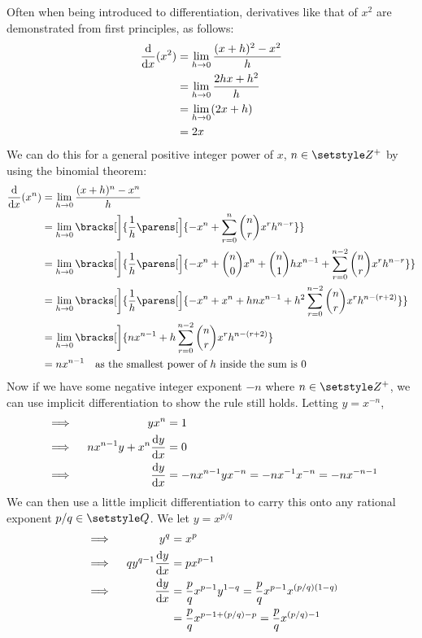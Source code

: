 Often when being introduced to differentiation, derivatives like that of
\(x^2\) are demonstrated from first principles, as follows:
\begin{align*}
    \dv{x}(x^2) &= \lim_{h \to 0} \frac{(x + h)^2 - x^2} h \\
                  &= \lim_{h \to 0} \frac{2hx + h^2} h \\
                  &= \lim_{h \to 0} (2x + h) \\
                  &= 2x
\end{align*}
We can do this for a general positive integer power of \(x\),
\(n \in \Integers^+\) by using the binomial theorem:
\begin{align*}
    \dv{x}(x^n) &= \lim_{h \to 0} \frac{(x + h)^n - x^n} h \\
                  &= \lim_{h \to 0} \bracks[\bigg]{\frac 1h \parens[\Big]{-x^n
                          + \sum_{r = 0}^n \binom nr x^r h^{n - r}}} \\
                  &= \lim_{h \to 0} \bracks[\bigg]{\frac 1h \parens[\Big]{
                          -x^n + \binom n0 x^n + \binom n1 hx^{n - 1}
                          + \sum_{r = 0}^{n - 2}
                  \binom nr x^r h^{n - r}}} \\
              &= \lim_{h \to 0} \bracks[\bigg]{\frac 1h \parens[\Big]{-x^n + x^n
                          + hnx^{n - 1} + h^2 \sum_{r = 0}^{n - 2}
                  \binom nr x^r h^{n - (r + 2)}}} \\
                  &= \lim_{h \to 0} \bracks[\bigg]{nx^{n - 1} + h \sum_{r = 0}^{n - 2}
                  \binom nr x^r h^{n - (r + 2)}} \\
                  &= nx^{n-1}\quad
                  \text{as the smallest power of \(h\) inside the sum is 0}
\end{align*}
Now if we have some negative integer exponent \(-n\) where
\(n \in \Integers^+\), we can use implicit differentiation to show the rule
still holds. Letting \(y = x^{-n}\),
\begin{alignat*}{2}
    &\implies{}& yx^n &= 1 \\
    &\implies{}& nx^{n - 1}y + x^n \dv<y>{x} &= 0 \\
    &\implies{}& \dv<y>{x} &= -nx^{n - 1}yx^{-n}
        = -nx^{-1}x^{-n} = -nx^{-n - 1}
\end{alignat*}
We can then use a little implicit differentiation to carry this onto any
rational exponent \(p / q \in \Rationals\). We let \(y = x^{p / q}\)
\begin{alignat*}{2}
    &\implies{}& y^q &= x^p \\
    &\implies{}& qy^{q - 1}\dv<y>{x} &= px^{p - 1} \\
    &\implies{}& \dv<y>{x} &= \frac pq x^{p - 1}y^{1 - q}
        = \frac pq x^{p - 1}x^{(p / q)(1 - q)} \\
    &&  &= \frac pq x^{p - 1 + (p / q) - p}
        = \frac pq x^{(p / q) - 1}
\end{alignat*}


